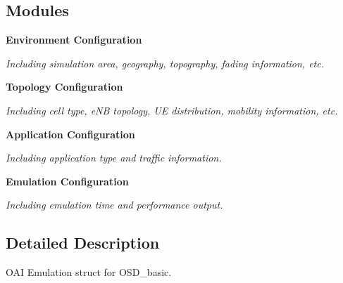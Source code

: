\subsection*{Modules}
\begin{CompactItemize}
\item 
{\bf Environment Configuration}
\begin{CompactList}\small\item\em Including simulation area, geography, topography, fading information, etc. \item\end{CompactList}

\item 
{\bf Topology Configuration}
\begin{CompactList}\small\item\em Including cell type, eNB topology, UE distribution, mobility information, etc. \item\end{CompactList}

\item 
{\bf Application Configuration}
\begin{CompactList}\small\item\em Including application type and traffic information. \item\end{CompactList}

\item 
{\bf Emulation Configuration}
\begin{CompactList}\small\item\em Including emulation time and performance output. \item\end{CompactList}

\end{CompactItemize}


\subsection{Detailed Description}
OAI Emulation struct for OSD\_\-basic. 